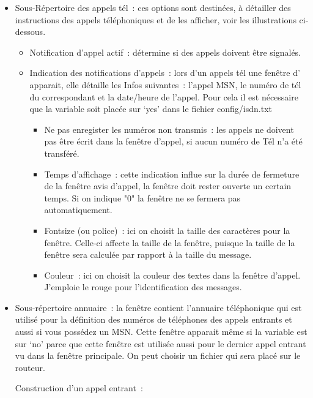 \begin{itemize}
  \item Sous-Répertoire des appels tél~:
    ces options sont destinées, à détailler des instructions des appels téléphoniques
    et de les afficher, voir les illustrations ci-dessous.
    \begin{itemize}
      \item Notification d'appel actif~: détermine si des appels doivent être signalés.
      \item Indication des notifications d'appels~: lors d'un appels tél une fenêtre d'
        apparait, elle détaille les Infos suivantes~: l'appel MSN, le numéro de tél du
        correspondant et la date/heure de l'appel. Pour cela il est nécessaire que la
        variable  soit placée sur `yes' dans le fichier
        config/isdn.txt
        \begin{itemize}
          \item Ne pas enregister les numéros non transmis~: les appels ne doivent pas
            être écrit dans la fenêtre d'appel, si aucun numéro de Tél n'a été transféré.
          \item Temps d'affichage~: cette indication influe sur la durée de fermeture de
            la fenêtre avis d'appel, la fenêtre doit rester ouverte un certain temps.
            Si on indique "0" la fenêtre ne se fermera pas automatiquement.
          \item Fontsize (ou police)~: ici on choisit la taille des caractères pour la
            fenêtre. Celle-ci affecte la taille de la fenêtre, puisque la taille de la
            fenêtre sera calculée par rapport à la taille du message.
          \item Couleur~: ici on choisit la couleur des textes dans la fenêtre d'appel.
            J'emploie le rouge pour l'identification des messages.
      \end{itemize}
    \end{itemize}

  \item Sous-répertoire annuaire~: la fenêtre contient l'annuaire téléphonique
    qui est utilisé pour la définition des numéros de téléphones des appels
    entrants et aussi si vous possédez un MSN. Cette fenêtre apparait même si la
    variable  est sur `no' parce que cette fenêtre est utilisée
    aussi pour le dernier appel entrant vu dans la fenêtre principale. On peut choisir
    un fichier qui sera placé sur le routeur.

    Construction d'un appel entrant~:


\end{itemize}
